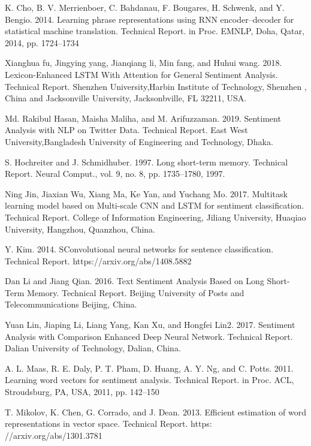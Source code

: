 \documentclass[sigplan,screen]{acmart}
\begin{document}
\begin{thebibliography}{1}
K. Cho, B. V. Merrienboer, C. Bahdanau, F. Bougares, H. Schwenk,
and Y. Bengio. 2014. Learning phrase representations using RNN encoder–decoder for statistical machine translation. Technical Report. in
Proc. EMNLP, Doha, Qatar, 2014, pp. 1724–1734

Xianghua fu, Jingying yang, Jianqiang li, Min fang, and Huhui wang.
2018. Lexicon-Enhanced LSTM With Attention for General Sentiment
Analysis. Technical Report. Shenzhen University,Harbin Institute of
Technology, Shenzhen , China and Jacksonville University, Jacksonbville, FL 32211, USA.

Md. Rakibul Hasan, Maisha Maliha, and M. Arifuzzaman. 2019. Sentiment Analysis with NLP on Twitter Data. Technical Report. East
West University,Bangladesh University of Engineering and Technology, Dhaka.

S. Hochreiter and J. Schmidhuber. 1997. Long short-term memory.
Technical Report. Neural Comput., vol. 9, no. 8, pp. 1735–1780, 1997.

Ning Jin, Jiaxian Wu, Xiang Ma, Ke Yan, and Yuchang Mo. 2017. Multitask learning model based on Multi-scale CNN and LSTM for sentiment
classification. Technical Report. College of Information Engineering,
Jiliang University, Huaqiao University, Hangzhou, Quanzhou, China.

Y. Kim. 2014. SConvolutional neural networks for sentence classification.
Technical Report. https://arxiv.org/abs/1408.5882


Dan Li and Jiang Qian. 2016. Text Sentiment Analysis Based on Long
Short-Term Memory. Technical Report. Beijing University of Posts and
Telecommunications Beijing, China.

Yuan Lin, Jiaping Li, Liang Yang, Kan Xu, and Hongfei Lin2. 2017.
Sentiment Analysis with Comparison Enhanced Deep Neural Network.
Technical Report. Dalian University of Technology, Dalian, China.

A. L. Maas, R. E. Daly, P. T. Pham, D. Huang, A. Y. Ng, and C. Potts.
2011. Learning word vectors for sentiment analysis. Technical Report.
in Proc. ACL, Stroudsburg, PA, USA, 2011, pp. 142–150

T. Mikolov, K. Chen, G. Corrado, and J. Dean. 2013. Efficient estimation of word representations in vector space. Technical Report. https:
//arxiv.org/abs/1301.3781


\end{thebibliography}
\end{document}
